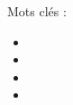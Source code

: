 \begin{titlepage}
\begin{textblock*}{15cm}
\begin{multicols}{2}
\begin{large}
                \columnbreak

                Mots clés :
                \begin{itemize}
                    \item \makeatletter \@keywordone \makeatother
                    \item \makeatletter \@keywordtwo \makeatother
                    \item \makeatletter \@keywordthree \makeatother
                    \item \makeatletter \@keywordfour \makeatother
                \end{itemize}
            \end{large}
        \end{multicols}
    \end{textblock*}
\end{titlepage}
